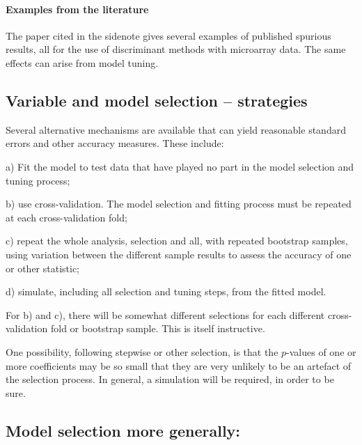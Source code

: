 \paragraph{Examples from the literature}

The paper cited in the sidenote gives
several examples of published spurious results, all for the use of
discriminant methods with microarray data.  The same effects can arise
from model tuning.

\subsection{Variable and model selection -- strategies}

Several alternative mechanisms are available that can yield reasonable
standard errors and other accuracy measures. These include:
\begin{itemizz}
\item[a)] Fit the model to test data that have played no part in
the model selection and tuning process;
\item[b)] use cross-validation.  The model selection and fitting
process must be repeated at each cross-validation fold;
\item[c)] repeat the whole analysis, selection and all, with repeated
 bootstrap samples, using variation between the different sample
results to assess the accuracy of one or other statistic;
\item[d)] simulate, including all selection and tuning steps, from the
  fitted model.
\end{itemizz}
For b) and c), there will be somewhat different selections for each
different cross-validation fold or bootstrap sample.  This is itself
instructive.

One possibility,
following stepwise or other selection, is that the
$p$-values of one or more coefficients may be so small that they are
very unlikely to be an artefact of the selection process.  In general,
a simulation will be required, in order to be sure.

\subsection*{Model selection more generally:}

